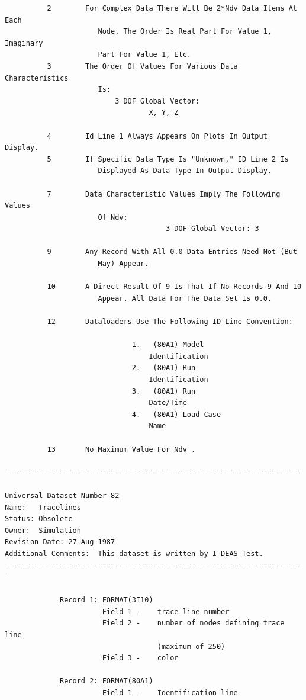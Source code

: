 \documentclass[10pt,openany,twoside]{book}
\numberwithin{equation}{section}   %
\begin{document}
\begin{verbatim}
          2        For Complex Data There Will Be 2*Ndv Data Items At Each
                      Node. The Order Is Real Part For Value 1,  Imaginary
                      Part For Value 1, Etc.
          3        The Order Of Values For Various Data  Characteristics
                      Is:
                          3 DOF Global Vector:
                                  X, Y, Z

          4        Id Line 1 Always Appears On Plots In Output Display.
          5        If Specific Data Type Is "Unknown," ID Line 2 Is
                      Displayed As Data Type In Output Display.

          7        Data Characteristic Values Imply The Following Values
                      Of Ndv:
                                      3 DOF Global Vector: 3

          9        Any Record With All 0.0 Data Entries Need Not (But
                      May) Appear.

          10       A Direct Result Of 9 Is That If No Records 9 And 10
                      Appear, All Data For The Data Set Is 0.0.

          12       Dataloaders Use The Following ID Line Convention:

                              1.   (80A1) Model
                                  Identification
                              2.   (80A1) Run
                                  Identification
                              3.   (80A1) Run
                                  Date/Time
                              4.   (80A1) Load Case
                                  Name

          13       No Maximum Value For Ndv .

----------------------------------------------------------------------

Universal Dataset Number 82
Name:   Tracelines
Status: Obsolete
Owner:  Simulation
Revision Date: 27-Aug-1987
Additional Comments:  This dataset is written by I-DEAS Test.
-----------------------------------------------------------------------

             Record 1: FORMAT(3I10)
                       Field 1 -    trace line number
                       Field 2 -    number of nodes defining trace line
                                    (maximum of 250)
                       Field 3 -    color

             Record 2: FORMAT(80A1)
                       Field 1 -    Identification line


\end{verbatim}
\end{document}
